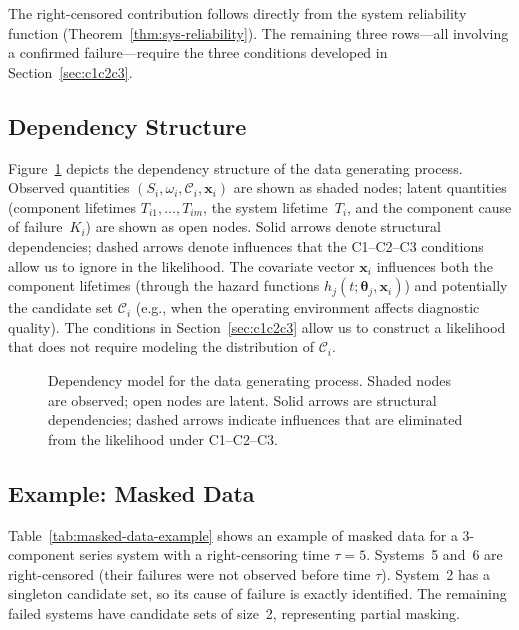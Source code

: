 \documentclass[11pt]{article}
\theoremstyle{definition}
\theoremstyle{plain}
\renewcommand{\v}[1]{\boldsymbol{#1}}
\begin{document}
The right-censored contribution follows directly from the system
reliability function (Theorem~\ref{thm:sys-reliability}).
The remaining three rows---all involving a confirmed failure---require the
three conditions developed in Section~\ref{sec:c1c2c3}.

\subsection{Dependency Structure}
\label{sec:dependency-structure}

Figure~\ref{fig:dep-model} depicts the dependency structure of the data
generating process.
Observed quantities $(S_i, \omega_i, \mathcal{C}_i, \v{x}_i)$ are shown
as shaded nodes; latent quantities (component lifetimes
$T_{i1}, \ldots, T_{im}$, the system lifetime~$T_i$, and the component
cause of failure~$K_i$) are shown as open nodes.
Solid arrows denote structural dependencies; dashed arrows denote
influences that the C1--C2--C3 conditions allow us to ignore in the
likelihood.
The covariate vector $\v{x}_i$ influences both the component lifetimes
(through the hazard functions $h_j(t; \v{\theta}_j, \v{x}_i)$) and
potentially the candidate set $\mathcal{C}_i$ (e.g., when the operating
environment affects diagnostic quality).
The conditions in Section~\ref{sec:c1c2c3} allow us to construct a
likelihood that does not require modeling the distribution of
$\mathcal{C}_i$.

\begin{figure}[ht]
\centering

\caption{Dependency model for the data generating process.
Shaded nodes are observed; open nodes are latent.
Solid arrows are structural dependencies; dashed arrows indicate
influences that are eliminated from the likelihood under C1--C2--C3.}
\label{fig:dep-model}
\end{figure}

\subsection{Example: Masked Data}
\label{sec:example-masked-data}

Table~\ref{tab:masked-data-example} shows an example of masked data for a
3-component series system with a right-censoring time $\tau = 5$.
Systems~5 and~6 are right-censored (their failures were not observed
before time $\tau$).
System~2 has a singleton candidate set, so its cause of failure is exactly
identified.
The remaining failed systems have candidate sets of size~2,
representing partial masking.
\end{document}
